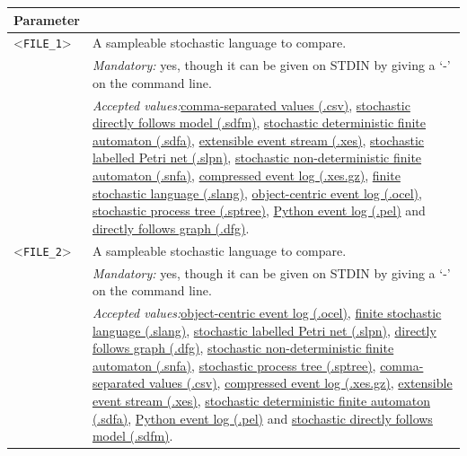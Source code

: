 {\begin{tabularx}{\linewidth}{lX}
\toprule
Parameter \\\midrule
<\texttt{FILE\_1}>&A sampleable stochastic language to compare.\\
&\textit{Mandatory:} \quad yes, though it can be given on STDIN by giving a `-' on the command line.\\
&\textit{Accepted values:}\quad \hyperref[filehandler:comma-separated values]{comma-separated values (.csv)}, \hyperref[filehandler:stochastic directly follows model]{stochastic directly follows model (.sdfm)}, \hyperref[filehandler:stochastic deterministic finite automaton]{stochastic deterministic finite automaton (.sdfa)}, \hyperref[filehandler:extensible event stream]{extensible event stream (.xes)}, \hyperref[filehandler:stochastic labelled Petri net]{stochastic labelled Petri net (.slpn)}, \hyperref[filehandler:stochastic non-deterministic finite automaton]{stochastic non-deterministic finite automaton (.snfa)}, \hyperref[filehandler:compressed event log]{compressed event log (.xes.gz)}, \hyperref[filehandler:finite stochastic language]{finite stochastic language (.slang)}, \hyperref[filehandler:object-centric event log]{object-centric event log (.ocel)}, \hyperref[filehandler:stochastic process tree]{stochastic process tree (.sptree)}, \hyperref[filehandler:Python event log]{Python event log (.pel)} and \hyperref[filehandler:directly follows graph]{directly follows graph (.dfg)}.\\
<\texttt{FILE\_2}>&A sampleable stochastic language to compare.\\
&\textit{Mandatory:} \quad yes, though it can be given on STDIN by giving a `-' on the command line.\\
&\textit{Accepted values:}\quad \hyperref[filehandler:object-centric event log]{object-centric event log (.ocel)}, \hyperref[filehandler:finite stochastic language]{finite stochastic language (.slang)}, \hyperref[filehandler:stochastic labelled Petri net]{stochastic labelled Petri net (.slpn)}, \hyperref[filehandler:directly follows graph]{directly follows graph (.dfg)}, \hyperref[filehandler:stochastic non-deterministic finite automaton]{stochastic non-deterministic finite automaton (.snfa)}, \hyperref[filehandler:stochastic process tree]{stochastic process tree (.sptree)}, \hyperref[filehandler:comma-separated values]{comma-separated values (.csv)}, \hyperref[filehandler:compressed event log]{compressed event log (.xes.gz)}, \hyperref[filehandler:extensible event stream]{extensible event stream (.xes)}, \hyperref[filehandler:stochastic deterministic finite automaton]{stochastic deterministic finite automaton (.sdfa)}, \hyperref[filehandler:Python event log]{Python event log (.pel)} and \hyperref[filehandler:stochastic directly follows model]{stochastic directly follows model (.sdfm)}.\\

\end{tabularx}}
